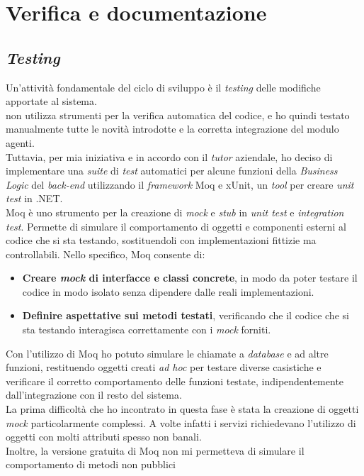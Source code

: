 \section{Verifica e documentazione}
\subsection{\textit{Testing}}
Un'attività fondamentale del ciclo di sviluppo è il \textit{testing} delle modifiche apportate al sistema.\\
{\company} non utilizza strumenti per la verifica automatica del codice, e ho quindi testato manualmente tutte 
le novità introdotte e la corretta integrazione del modulo agenti.\\
Tuttavia, per mia iniziativa e in accordo con il \textit{tutor} aziendale, ho deciso di implementare una \textit{suite} di 
\textit{test} automatici per alcune funzioni della \textit{Business Logic} del \textit{back-end} utilizzando il \textit{framework} 
Moq e xUnit, un \textit{tool} per creare \textit{unit test} in .NET.\\
Moq è uno strumento per la creazione di \textit{mock} e \textit{stub} in \textit{unit test} 
e \textit{integration test}. Permette di simulare il comportamento di oggetti e componenti esterni al codice che si sta 
testando, sostituendoli con implementazioni fittizie ma controllabili. Nello specifico, Moq consente di:
\begin{itemize}
    \item \textbf{Creare \textit{mock} di interfacce e classi concrete}, in modo da poter testare il codice in modo isolato 
          senza dipendere dalle reali implementazioni.
    \item \textbf{Definire aspettative sui metodi testati}, verificando che il codice che si sta testando 
          interagisca correttamente con i \textit{mock} forniti.
\end{itemize}
Con l'utilizzo di Moq ho potuto simulare le chiamate a \textit{database} e ad altre funzioni, restituendo oggetti creati \textit{ad hoc}
per testare diverse casistiche e verificare il corretto comportamento delle funzioni testate, indipendentemente 
dall'integrazione con il resto del sistema.\\
La prima difficoltà che ho incontrato in questa fase è stata la creazione di oggetti \textit{mock} particolarmente 
complessi. A volte infatti i servizi richiedevano l'utilizzo di oggetti con molti attributi spesso non banali.\\
Inoltre, la versione gratuita di Moq non mi permetteva di simulare il comportamento di metodi non pubblici 
